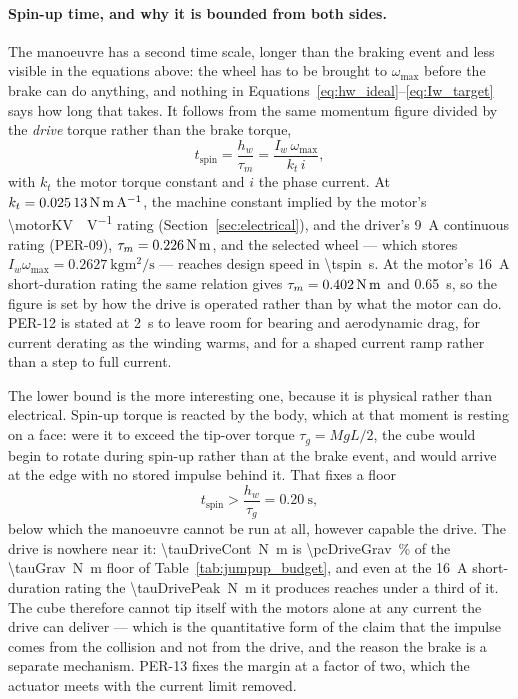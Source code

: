 \paragraph{Spin-up time, and why it is bounded from both sides.} The manoeuvre
has a second time scale, longer than the braking event and less visible in the
equations above: the wheel has to be brought to $\omega_{\max}$ before the
brake can do anything, and nothing in
Equations~\eqref{eq:hw_ideal}--\eqref{eq:Iw_target} says how long that takes.
It follows from the same momentum figure divided by the \emph{drive} torque
rather than the brake torque,
\begin{equation}
t_{\text{spin}} = \frac{h_w}{\tau_m} = \frac{I_w\,\omega_{\max}}{k_t\,i},
\label{eq:t_spin}
\end{equation}
with $k_t$ the motor torque constant and $i$ the phase current. At
$k_t = \qty{0.02513}{\newton\metre\per\ampere}$, the machine constant implied
by the motor's \qty{\motorKV}{\rpm\per\volt} rating
(Section~\ref{sec:electrical}), and the driver's \qty{9}{\ampere} continuous
rating (PER-09), $\tau_m = \qty{0.226}{\newton\metre}$, and the selected wheel
--- which stores $I_w\omega_{\max} = \qty{0.2627}{\kilo\gram\metre\squared\per\second}$
--- reaches design speed in \qty{\tspin}{\second}. At the motor's
\qty{16}{\ampere} short-duration rating the same relation gives
$\tau_m = \qty{0.402}{\newton\metre}$ and \qty{0.65}{\second}, so the
figure is set by how the drive is operated rather than by what the motor can
do. PER-12 is stated at \qty{2}{\second} to leave room for bearing and
aerodynamic drag, for current derating as the winding warms, and for a shaped
current ramp rather than a step to full current.

The lower bound is the more interesting one, because it is physical rather
than electrical. Spin-up torque is reacted by the body, which at that moment
is resting on a face: were it to exceed the tip-over torque $\tau_g = MgL/2$,
the cube would begin to rotate during spin-up rather than at the brake event,
and would arrive at the edge with no stored impulse behind it. That fixes a
floor
\[
t_{\text{spin}} > \frac{h_w}{\tau_g} = \qty{0.20}{\second},
\]
below which the manoeuvre cannot be run at all, however capable the drive.
The drive is nowhere near it: \qty{\tauDriveCont}{\newton\metre} is
\qty{\pcDriveGrav}{\percent} of the \qty{\tauGrav}{\newton\metre} floor of
Table~\ref{tab:jumpup_budget}, and even at the \qty{16}{\ampere}
short-duration rating the \qty{\tauDrivePeak}{\newton\metre} it produces
reaches under a third of it. The cube therefore cannot tip itself with the motors
alone at any current the drive can deliver --- which is the quantitative form
of the claim that the impulse comes from the collision and not from the drive,
and the reason the brake is a separate mechanism. PER-13 fixes the margin at a
factor of two, which the actuator meets with the current limit removed.

